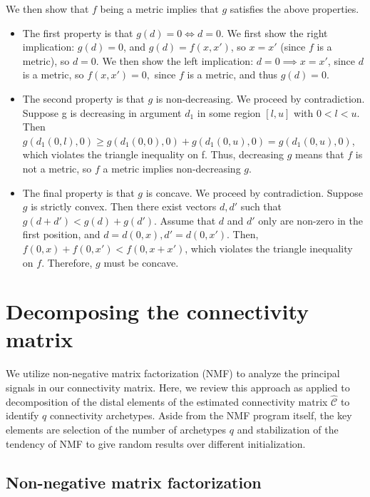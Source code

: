 \documentclass{article}
\begin{document}
We then show that $f$ being a metric implies that $g$ satisfies the above properties.
\begin{itemize}
    \item The first property is that $g(d) = 0 \Longleftrightarrow d = 0$. We first show the right implication: $g(d) = 0$, and $g(d) = f(x,x')$, so $x = x'$ (since $f$ is a metric), so $d = 0$. We then show the left implication: $d = 0 \implies x = x'$, since $d$ is a metric, so $f(x,x') = 0,$ since $f$ is a metric, and thus $g(d) = 0$.
    \item The second property is that $g$ is non-decreasing. We proceed by contradiction.
    Suppose g is decreasing in argument $d_1$ in some region $[l, u]$ with $0 < l< u$.
    Then $g(d_1(0, l), 0) \geq g(d_1(0, 0), 0) + g(d_1(0, u), 0) = g(d_1(0, u),0)$, which violates the triangle inequality on f. Thus, decreasing $g$ means that $f$ is not a metric, so $f$ a metric implies non-decreasing $g$.
    \item The final property is that $g$ is concave. We proceed by contradiction. Suppose $g$ is strictly convex. Then there exist vectors $d, d'$ such that $g(d + d')  < g(d) + g(d')$.  Assume that $d$ and $d'$ only are non-zero in the first position, and $d = d(0, x), d' = d(0,x')$.  Then, $f(0,x) + f(0,x') <  f(0,x+ x')$, which violates the triangle inequality on $f$.  Therefore, $g$ must be concave.
\end{itemize}

\section{Decomposing the connectivity matrix}

We utilize non-negative matrix factorization (NMF) to analyze the principal signals in our connectivity matrix.
Here, we review this approach as applied to decomposition of the distal elements of the estimated connectivity matrix $\widehat {\mathcal C}$ to identify $q$ connectivity archetypes.
Aside from the NMF program itself, the key elements are selection of the number of archetypes $q$ and stabilization of the tendency of NMF to give random results over different initialization. 

\subsection{Non-negative matrix factorization}
\end{document}
